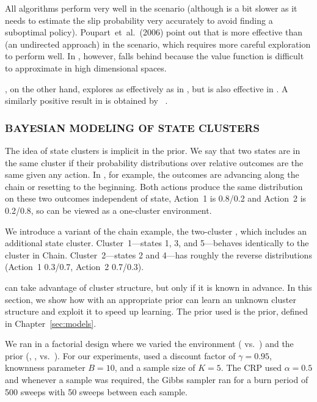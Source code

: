 All algorithms perform very well in the  scenario (although
 is a bit slower as it needs to estimate the slip probability
very accurately to avoid finding a suboptimal policy).
Poupart~et~al.~(2006) point out that  is more effective than  (an undirected approach) in
the  scenario, which requires more careful exploration to perform
well.  In , however,  falls behind because the value function is difficult to approximate in high dimensional spaces. 

, on the other hand, explores as effectively as  in ,
but is also effective in .  A similarly positive result in  is
obtained by ~\cite{strens00}.

\subsubsection{BAYESIAN MODELING OF STATE CLUSTERS}
\label{s:cluster}

The idea of state clusters is implicit in the  prior.
We say that two states are in the same cluster if
their probability distributions over relative outcomes are the same
given any action.  In , for example, the outcomes are advancing along the
chain or resetting to the beginning.  Both actions produce the
same distribution on these two outcomes independent of state, Action~1
is 0.8/0.2 and Action~2 is 0.2/0.8, so  can be viewed as a
one-cluster environment.

We introduce a variant of the chain example, the two-cluster ,
which includes an additional state cluster.  Cluster~1---states 1, 3,
and 5---behaves identically to the cluster in Chain.
Cluster~2---states 2 and 4---has roughly the reverse
distributions (Action~1 0.3/0.7, Action~2 0.7/0.3).

 can take advantage of
cluster structure, but only if it is known in advance.  In this
section, we show how  with an appropriate prior can learn an
unknown cluster structure and exploit it to speed up learning. The prior used is the  prior, defined in Chapter~\ref{sec:models}.


We ran  in a factorial design where we varied the environment
( vs.\ ) and the prior (, , vs.\ ).  For our
experiments,  used a discount factor of $\gamma = 0.95$,
knownness parameter $B=10$, and a sample size of $K=5$.  The
 CRP used $\alpha=0.5$ and whenever a
sample was required, the Gibbs sampler ran for a burn period of 500
sweeps with 50 sweeps between each sample.

